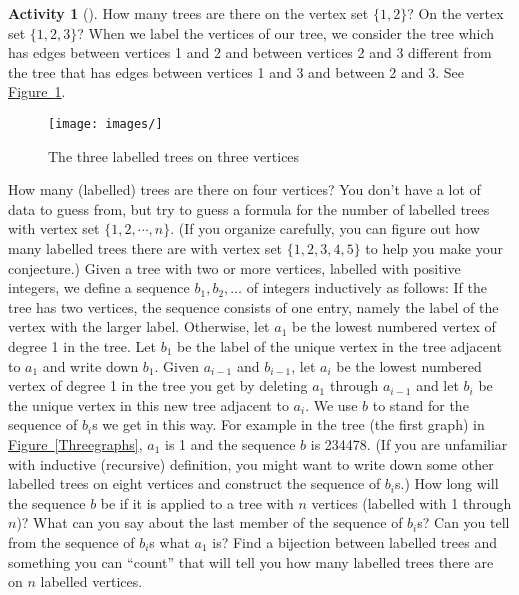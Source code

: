 \documentclass[10pt,]{book}
\theoremstyle{plain}
\theoremstyle{definition}
\newtheorem{activity}[project]{Activity}
\numberwithin{equation}{chapter}
\begin{document}
\begin{activity}[]\label{Prufer}
How many trees are there on the vertex set \(\{1,2\}\)? On the vertex set \(\{1,2,3\}\)? When we label the vertices of our tree, we consider the tree which has edges between vertices 1 and 2 and between vertices 2 and 3 different from the tree that has edges between vertices 1 and 3 and between 2 and 3. See \hyperref[differenttrees]{Figure~\ref{differenttrees}}.%
\begin{figure}
\centering
\texttt{[image: images/]}
\caption{The three labelled trees on three vertices\label{differenttrees}}
\end{figure}
How many (labelled) trees are there on four vertices? You don't have a lot of data to guess from, but try to guess a formula for the number of labelled trees with vertex set \(\{1,2,\cdots,n\}\). (If you organize carefully, you can figure out how many labelled trees there are with vertex set \(\{1,2,3,4,5\}\) to help you make your conjecture.) Given a tree with two or more vertices, labelled with positive integers, we define a sequence \(b_1,b_2,\ldots\) of integers inductively as follows: If the tree has two vertices, the sequence consists of one entry, namely the label of the vertex with the larger label. Otherwise, let \(a_1\) be the lowest numbered vertex of degree 1 in the tree. Let \(b_1\) be the label of the unique vertex in the tree adjacent to \(a_1\) and write down \(b_1\). Given \(a_{i-1}\) and \(b_{i-1}\), let \(a_i\) be the lowest numbered vertex of degree 1 in the tree you get by deleting \(a_1\) through \(a_{i-1}\) and let \(b_i\) be the unique vertex in this new tree adjacent to \(a_i\). We use \(b\) to stand for the sequence of \(b_i\)s we get in this way. For example in the tree (the first graph) in \hyperref[Threegraphs]{Figure~\ref{Threegraphs}}, \(a_1\) is 1 and the sequence \(b\) is 234478. (If you are unfamiliar with inductive (recursive) definition, you might want to write down some other labelled trees on eight vertices and construct the sequence of \(b_i\)s.) How long will the sequence \(b\) be if it is applied to a tree with \(n\) vertices (labelled with 1 through \(n\))? What can you say about the last member of the sequence of \(b_i\)s? Can you tell from the sequence of \(b_i\)s what \(a_1\) is? Find a bijection between labelled trees and something you can ``count'' that will tell you how many labelled trees there are on \(n\) labelled vertices.%
\par\medskip\noindent%

\end{activity}
\end{document}
